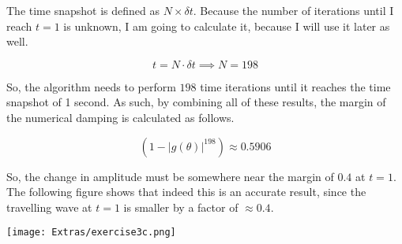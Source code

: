 The time snapshot is defined as \(N \times \delta t\). Because the number of iterations until I reach \(t = 1\) is unknown, I am going to calculate it, because I will use it later as well.

\[
	t = N \cdot \delta t \implies N = 198
\]

So, the algorithm needs to perform \( 198 \) time iterations until it reaches the time snapshot of 1 second. As such, by combining all of these results, the margin of the numerical damping is calculated as follows.

\[
	\left( 1 - |g(\theta)|^{198} \right) \approx 0.5906
\]

So, the change in amplitude must be somewhere near the margin of \( 0.4 \) at \(t = 1\). The following figure shows that indeed this is an accurate result, since the travelling wave at \(t = 1\) is smaller by a factor of \( \approx 0.4 \).

\begin{center}
	\texttt{[image: Extras/exercise3c.png]}
\end{center}

